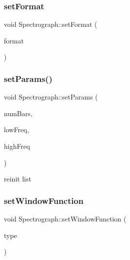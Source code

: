 \subsubsection{\texorpdfstring{set\+Format}{setFormat}}
{\footnotesize\ttfamily void Spectrograph\+::set\+Format (\begin{DoxyParamCaption}\item[{const Q\+Audio\+Format \&}]{format }\end{DoxyParamCaption})\hspace{0.3cm}{\ttfamily [slot]}}

\hypertarget{class_spectrograph_a5eba417e888dc0871f5ad1348849b693}{}\label{class_spectrograph_a5eba417e888dc0871f5ad1348849b693} 
\subsubsection{\texorpdfstring{set\+Params()}{setParams()}}
{\footnotesize\ttfamily void Spectrograph\+::set\+Params (\begin{DoxyParamCaption}\item[{int}]{num\+Bars,  }\item[{qreal}]{low\+Freq,  }\item[{qreal}]{high\+Freq }\end{DoxyParamCaption})}

reinit list \hypertarget{class_spectrograph_a3c6f5ae666d675d0326271511b38f4a2}{}\label{class_spectrograph_a3c6f5ae666d675d0326271511b38f4a2} 
\subsubsection{\texorpdfstring{set\+Window\+Function}{setWindowFunction}}
{\footnotesize\ttfamily void Spectrograph\+::set\+Window\+Function (\begin{DoxyParamCaption}\item[{\hyperlink{spectrum_8h_adae4545e1609513867a86cc5e91fc1d4}{Window\+Function}}]{type }\end{DoxyParamCaption})\hspace{0.3cm}{\ttfamily [slot]}}

\hypertarget{class_spectrograph_af9cdafaa2e367c697a253a66e25c62a4}{}\label{class_spectrograph_af9cdafaa2e367c697a253a66e25c62a4} 
